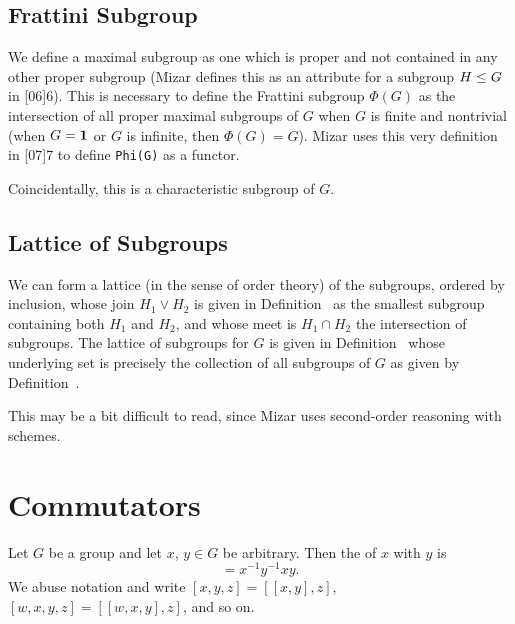 \subsection{Frattini Subgroup}
We define a maximal subgroup as one which is proper and not contained in
any other proper subgroup (Mizar defines this as an attribute for a
subgroup $H\leq G$ in [06]{6}).
This is necessary to define the Frattini subgroup $\Phi(G)$ as the
intersection of all proper maximal subgroups of $G$ when $G$ is finite
and nontrivial (when $G=\mathbf{1}$ or $G$ is infinite, then
$\Phi(G)=G$). Mizar uses this very definition in
[07]{7} to define \texttt{Phi(G)}
as a functor.

Coincidentally, this is a characteristic subgroup of $G$.

\subsection{Lattice of Subgroups}
We can form a lattice (in the sense of order theory) of the subgroups,
ordered by inclusion, whose join $H_{1}\lor H_{2}$ is given in
Definition~ as the smallest subgroup
containing both $H_{1}$ and $H_{2}$, and whose meet is $H_{1}\cap H_{2}$
the intersection of subgroups. The lattice of subgroups for $G$ is given
in Definition~ whose underlying set is precisely the
collection of all subgroups of $G$ as given by Definition~.

This may be a bit difficult to read, since Mizar uses second-order
reasoning with schemes.

\section{Commutators}

\begin{definition}
  Let $G$ be a group and let $x$, $y\in G$ be arbitrary.
  Then the  of $x$ with $y$ is
  \begin{equation*}
    [x,y] = x^{-1}y^{-1}xy.
  \end{equation*}
  We abuse notation and write $[x,y,z] = [{[x,y]},z]$,
  $[w,x,y,z] = [{[w,x,y]},z]$, and so on.
\end{definition}


